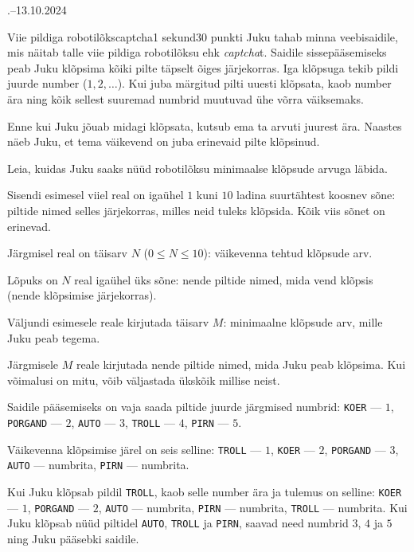 \documentclass[a4paper,11pt]{article}
\begin{document}
\begin{ol}{\eio}{.--13.10.2024}{\yle}{}
  \begin{yl}{2}{Viie pildiga robotilõks}{captcha}{1 sekund}{30 punkti}
    Juku tahab minna veebisaidile, mis näitab talle viie pildiga robotilõksu ehk \textit{captcha}t.
    Saidile sissepääsemiseks peab Juku klõpsima kõiki pilte täpselt õiges järjekorras.
    Iga klõpsuga tekib pildi juurde number ($1, 2, \ldots$).
    Kui juba märgitud pilti uuesti klõpsata, kaob number ära ning kõik sellest suuremad numbrid muutuvad ühe võrra väiksemaks.

    Enne kui Juku jõuab midagi klõpsata, kutsub ema ta arvuti juurest ära. Naastes näeb Juku, et tema väikevend on juba erinevaid pilte klõpsinud.

    Leia, kuidas Juku saaks nüüd robotilõksu minimaalse klõpsude arvuga läbida.

    \sis Sisendi esimesel viiel real on igaühel $1$ kuni $10$ ladina suurtähtest koosnev sõne: piltide nimed selles järjekorras, milles neid tuleks klõpsida. Kõik viis sõnet on erinevad.

    Järgmisel real on täisarv $N$ ($0 \le N \le 10$): väikevenna tehtud klõpsude arv.

    Lõpuks on $N$ real igaühel üks sõne: nende piltide nimed, mida vend klõpsis (nende klõpsimise järjekorras).

    \val Väljundi esimesele reale kirjutada täisarv $M$: minimaalne klõpsude arv, mille Juku peab tegema.

    Järgmisele $M$ reale kirjutada nende piltide nimed, mida Juku peab klõpsima. Kui võimalusi on mitu, võib väljastada ükskõik millise neist.

    \nde[0]{3cm}{3cm}

    Saidile pääsemiseks on vaja saada piltide juurde järgmised numbrid: \verb/KOER/ --- $1$, \verb/PORGAND/ --- $2$, \verb/AUTO/ --- $3$, \verb/TROLL/ --- $4$, \verb/PIRN/ --- $5$.

    Väikevenna klõpsimise järel on seis selline: \verb/TROLL/ --- $1$, \verb/KOER/ --- $2$, \verb/PORGAND/ --- $3$, \verb/AUTO/ --- numbrita, \verb/PIRN/ --- numbrita.

    Kui Juku klõpsab pildil \verb/TROLL/, kaob selle number ära ja tulemus on selline: \verb/KOER/ --- $1$, \verb/PORGAND/ --- $2$, \verb/AUTO/ --- numbrita, \verb/PIRN/ --- numbrita, \verb/TROLL/ --- numbrita.
    Kui Juku klõpsab nüüd piltidel \verb/AUTO/, \verb/TROLL/ ja \verb/PIRN/, saavad need numbrid $3$, $4$ ja $5$ ning Juku pääsebki saidile.


\end{yl}
\end{ol}
\end{document}
